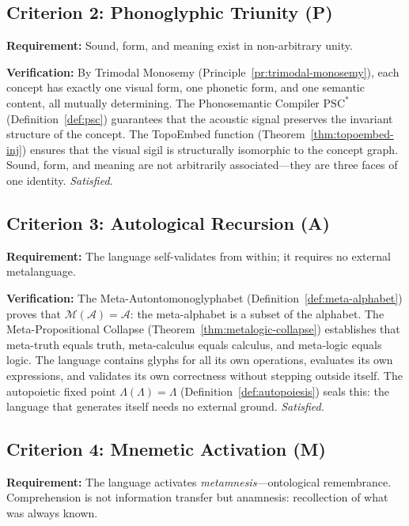 \documentclass[12pt, letterpaper]{book}
\def\equiv{=}%
\begin{document}
\subsection{Criterion 2: Phonoglyphic Triunity (P)}

\textbf{Requirement:} Sound, form, and meaning exist in non-arbitrary unity.

\textbf{Verification:} By Trimodal Monosemy (Principle~\ref{pr:trimodal-monosemy}), each concept has exactly one visual form, one phonetic form, and one semantic content, all mutually determining. The Phonosemantic Compiler $\mathrm{PSC}^*$ (Definition~\ref{def:psc}) guarantees that the acoustic signal preserves the invariant structure of the concept. The TopoEmbed function (Theorem~\ref{thm:topoembed-inj}) ensures that the visual sigil is structurally isomorphic to the concept graph. Sound, form, and meaning are not arbitrarily associated---they are three faces of one identity. \textit{Satisfied.}

\subsection{Criterion 3: Autological Recursion (A)}

\textbf{Requirement:} The language self-validates from within; it requires no external metalanguage.

\textbf{Verification:} The Meta-Autontomonoglyphabet (Definition~\ref{def:meta-alphabet}) proves that $\mathcal{M}(\mathcal{A}) \equiv \mathcal{A}$: the meta-alphabet is a subset of the alphabet. The Meta-Propositional Collapse (Theorem~\ref{thm:metalogic-collapse}) establishes that meta-truth equals truth, meta-calculus equals calculus, and meta-logic equals logic. The language contains glyphs for all its own operations, evaluates its own expressions, and validates its own correctness without stepping outside itself. The autopoietic fixed point $\Lambda(\Lambda) \equiv \Lambda$ (Definition~\ref{def:autopoiesis}) seals this: the language that generates itself needs no external ground. \textit{Satisfied.}

\subsection{Criterion 4: Mnemetic Activation (M)}

\textbf{Requirement:} The language activates \textit{metamnesis}---ontological remembrance. Comprehension is not information transfer but anamnesis: recollection of what was always known.
\end{document}
